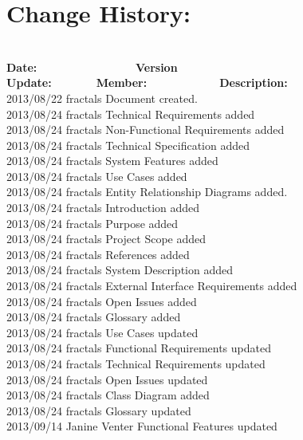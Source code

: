 \documentclass[29pt,a4paper]{moderncv}
\begin{document}
\section{\textbf{Change History:}}
\begin{tabbing}
\\\textbf{Date:} ~~~~~~~~~~~~~~~~~\= \textbf{Version Update:}~~~~~~~~\= \textbf{Member:}~~~~~~~~~~~~~\= \textbf{Description:}\\
2013/08/22 \> fractals \> Document created.\\
2013/08/24  \> fractals \>  Technical Requirements added\\
2013/08/24  \> fractals \> Non-Functional Requirements added\\
2013/08/24  \> fractals \>  Technical Specification added\\
2013/08/24  \> fractals \> System Features added\\
2013/08/24  \> fractals \> Use Cases added\\
2013/08/24  \> fractals \> Entity Relationship Diagrams added.  \\
2013/08/24  \> fractals \> Introduction added  \\
2013/08/24  \> fractals \> Purpose added  \\
2013/08/24  \> fractals \> Project Scope added  \\
2013/08/24  \> fractals \> References added  \\
2013/08/24  \> fractals \> System Description added  \\
2013/08/24  \> fractals \> External Interface Requirements added  \\
2013/08/24  \> fractals \> Open Issues added  \\
2013/08/24  \> fractals \> Glossary added  \\
2013/08/24  \> fractals \> Use Cases updated  \\
2013/08/24  \> fractals \> Functional Requirements updated  \\
2013/08/24  \> fractals \> Technical Requirements updated  \\
2013/08/24  \> fractals \> Open Issues updated  \\
2013/08/24  \> fractals \> Class Diagram added  \\
2013/08/24  \> fractals \> Glossary updated  \\
2013/09/14  \> Janine Venter \> Functional Features updated\\

\end{tabbing}
\end{document}
